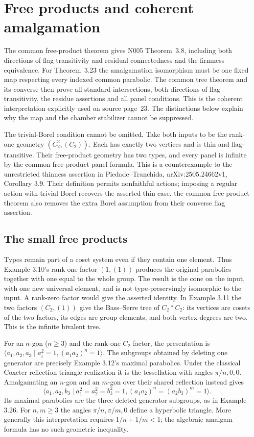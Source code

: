 \section{Free products and coherent amalgamation}\label{sec:app-products}
The common free-product theorem gives N005 Theorem~3.8, including both directions of flag transitivity and residual connectedness and the firmness equivalence. For Theorem~3.23 the amalgamation isomorphism must be one fixed map respecting every indexed common parabolic. The common tree theorem and its converse then prove all standard intersections, both directions of flag transitivity, the residue assertions and all panel conditions. This is the coherent interpretation explicitly used on source page~23. The distinctions below explain why the map and the chamber stabilizer cannot be suppressed.

The trivial-Borel condition cannot be omitted. Take both inputs to
be the rank-one geometry $(C_2^2,(C_2))$. Each has exactly two
vertices and is thin and flag-transitive. Their free-product geometry
has two types, and every panel is infinite by
the common free-product panel formula. This is a counterexample to the
unrestricted thinness assertion in Piedade--Tranchida,
arXiv:2505.24662v1, Corollary 3.9. Their definition permits
nonfaithful actions; imposing a regular action with trivial Borel
recovers the asserted thin case. the common free-product theorem also removes
the extra Borel assumption from their converse flag assertion.


\subsection{The small free products}
Types remain part of a coset system even if they contain one element.
Thus Example 3.10's rank-one factor $(1,(1))$ produces the original
parabolics together with one equal to the whole group. The result
is the cone on the input, with one new universal element, and is
not type-preservingly isomorphic to the input. A rank-zero factor
would give the asserted identity. In Example 3.11 the two factors
$(C_2,(1))$ give the Bass--Serre tree of $C_2*C_2$: its vertices
are cosets of the two factors, its edges are group elements, and
both vertex degrees are two. This is the infinite bivalent tree.

For an $n$-gon ($n\geq3$) and the rank-one $C_2$ factor, the
presentation is
$\langle a_1,a_2,a_3\mid a_i^2=1,(a_1a_2)^n=1\rangle$.
The subgroups obtained by deleting one generator are precisely
Example 3.12's maximal parabolics. Under the classical Coxeter
reflection-triangle realization it is the tessellation with angles
$\pi/n,0,0$. Amalgamating an $n$-gon and an $m$-gon over their
shared reflection instead gives
\[
 \langle a_1,a_2,b_3\mid a_1^2=a_2^2=b_3^2=1,
 (a_1a_2)^n=(a_2b_3)^m=1\rangle.
\]
Its maximal parabolics are the three deleted-generator subgroups,
as in Example 3.26. For $n,m\geq3$ the angles $\pi/n,\pi/m,0$
define a hyperbolic triangle. More generally this interpretation
requires $1/n+1/m<1$; the algebraic amalgam formula has no such
geometric inequality.

